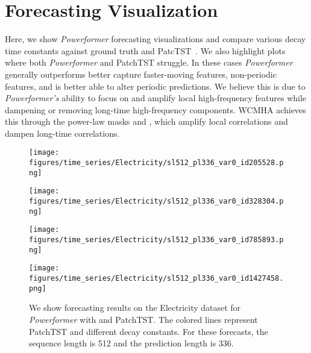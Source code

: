 \section{Forecasting Visualization}
\label{sm:visualizations}

Here, we show \emph{Powerformer} forecasting visualizations and compare various decay time constants against ground truth and PatcTST~\cite{nie.patchtst.2023a}.
We also highlight plots where both \emph{Powerformer} and PatchTST struggle.
In these cases \emph{Powerformer} generally outperforms better capture faster-moving features, non-periodic features, and is better able to alter periodic predictions.
We believe this is due to \emph{Powerformer's} ability to focus on and amplify local high-frequency features while dampening or removing long-time high-frequency components.
WCMHA achieves this through the power-law masks \fpl{} and \fspl, which amplify local correlations and dampen long-time correlations.

\begin{figure}[!hb]
\begin{minipage}{.5\textwidth}
    \texttt{[image: figures/time\_series/Electricity/sl512\_pl336\_var0\_id205528.png]}
\end{minipage}
\hfill    
\begin{minipage}{.5\textwidth}
    \texttt{[image: figures/time\_series/Electricity/sl512\_pl336\_var0\_id328304.png]}
\end{minipage}
\begin{minipage}{.5\textwidth}
    \texttt{[image: figures/time\_series/Electricity/sl512\_pl336\_var0\_id785893.png]}
\end{minipage}
\hfill    
\begin{minipage}{.5\textwidth}
    \texttt{[image: figures/time\_series/Electricity/sl512\_pl336\_var0\_id1427458.png]}
\end{minipage}
\caption{We show forecasting results on the Electricity dataset for \emph{Powerformer} with \fpl{} and PatchTST. The colored lines represent PatchTST and different \fpl{} decay constants. For these forecasts, the sequence length is 512 and the prediction length is 336.}
\end{figure}





